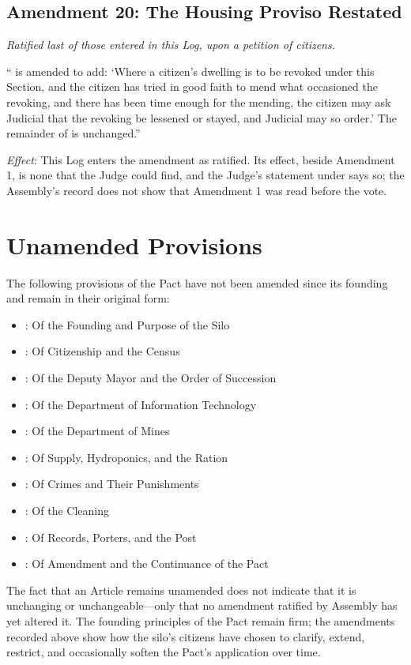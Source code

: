 \subsection*{Amendment 20: The Housing Proviso Restated}

\textit{Ratified last of those entered in this Log, upon a petition of citizens.}

`` is amended to add: `Where a citizen's dwelling is to be revoked under this Section, and the citizen has tried in good faith to mend what occasioned the revoking, and there has been time enough for the mending, the citizen may ask Judicial that the revoking be lessened or stayed, and Judicial may so order.' The remainder of  is unchanged.''

\textit{Effect}: This Log enters the amendment as ratified. Its effect, beside Amendment 1, is none that the Judge could find, and the Judge's statement under  says so; the Assembly's record does not show that Amendment 1 was read before the vote.

\section*{Unamended Provisions}

The following provisions of the Pact have not been amended since its founding and remain in their original form:

\begin{itemize}
\item {}: Of the Founding and Purpose of the Silo
\item {}: Of Citizenship and the Census
\item {}: Of the Deputy Mayor and the Order of Succession
\item {}: Of the Department of Information Technology
\item {}: Of the Department of Mines
\item {}: Of Supply, Hydroponics, and the Ration
\item {}: Of Crimes and Their Punishments
\item {}: Of the Cleaning
\item {}: Of Records, Porters, and the Post
\item {}: Of Amendment and the Continuance of the Pact
\end{itemize}

The fact that an Article remains unamended does not indicate that it is unchanging or unchangeable---only that no amendment ratified by Assembly has yet altered it. The founding principles of the Pact remain firm; the amendments recorded above show how the silo's citizens have chosen to clarify, extend, restrict, and occasionally soften the Pact's application over time.
